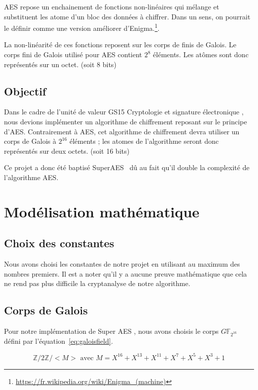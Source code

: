 \documentclass[12pt,a4paper]{report}
\begin{document}
AES repose un enchainement de fonctions non-linéaires qui mélange et substituent les
atome d'un bloc des données à chiffrer. Dans un sens, on pourrait le définir comme une
version améliorer d'Enigma.\footnote{\url{https://fr.wikipedia.org/wiki/Enigma_(machine)}}.

La non-linéarité de ces fonctions reposent sur les corps de finis de Galois. Le
corps fini de Galois utilisé pour AES contient $2^{8}$ éléments. Les atômes
sont donc représentés sur un octet. (soit 8 bits)

\section{Objectif}

Dans le cadre de l'unité de valeur GS15 \og Cryptologie et signature
électronique \fg, nous devions implémenter un algorithme de chiffrement
reposant sur le principe d'AES. Contrairement à AES, cet algorithme de
chiffrement devra utiliser un corps de Galois à $2^{16}$ éléments ; les atomes
de l'algorithme seront donc représentés sur deux octets. (soit 16 bits)

Ce projet a donc été baptisé \og SuperAES \fg\ dû au fait qu'il double la complexité
de l'algorithme AES.


\chapter{Modélisation mathématique}

\section{Choix des constantes}

Nous avons choisi les constantes de notre projet en utilisant au maximum des
nombres premiers. Il est a noter qu'il y a aucune preuve mathématique que
cela ne rend pas plus difficile la cryptanalyse de notre algorithme.

\section{Corps de Galois}

Pour notre implémentation de \og Super AES \fg, nous avons choisis le corps
$G\mathbb{F}_{2^{16}}$ défini par l'équation~\ref{eq:galoisfield}.

\begin{equation}
\label{eq:galoisfield}
\mathbb{Z}/2\mathbb{Z}/<M> \mbox{ avec } M = X^{16} + X^{13} + X^{11} + X^{7} + X^{5} + X^{3} + 1
\end{equation}
\end{document}
